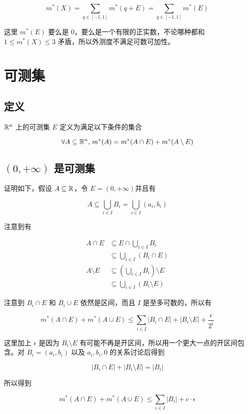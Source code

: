 \[
m^*(X) = \sum_{q \in [-1,1]}m^*(q+E) =  \sum_{q \in [-1,1]}m^*(E)
\]

这里 $m^*(E)$ 要么是 $0$，要么是一个有限的正实数，不论哪种都和 $1 \le m^*(X) \le 3$ 矛盾，所以外测度不满足可数可加性。


\section{可测集}

\subsection{定义}

$\mathbb{R}^n $ 上的可测集 $E$ 定义为满足以下条件的集合

\[
\forall A \subseteq \mathbb{R}^n,\, m^*(A) = m^*(A \cap E) + m^*(A \setminus E)
\]

\subsection{$(0, +\infty)$ 是可测集} 

证明如下，假设 $A \subseteq \mathbb{R}$，令 $ E = (0, +\infty)$并且有

\[
A \subseteq \bigcup_{i \in I} B_i = \bigcup_{i \in I} (a_i, b_i)
\]

注意到有

\begin{align*}
A \cap E &\subseteq E \cap \bigcup_{i \in I} B_i \\
 & \subseteq \bigcup_{i \in I} (B_i \cap E) \\
A \setminus E &\subseteq  (\bigcup_{i \in I} B_i) \setminus E \\
 & \subseteq \bigcup_{i \in I} (B_i \setminus E)
\end{align*}

注意到 $B_i \cap E$ 和 $B_i \cup E$ 依然是区间，而且 $I$ 是至多可数的，所以有

\[
m^*(A\cap E) + m^*(A \cup E) \le \sum_{i \in I} \lvert B_i \cap E\rvert + \lvert B_i \setminus E \rvert + \frac{\epsilon}{2^i}
\]

这里加上 $\epsilon$ 是因为 $B_i \setminus E$ 有可能不再是开区间，所以用一个更大一点的开区间包含。对 $B_i = (a_i, b_i)$ 以及 $a_i, b_i, 0$ 的关系讨论后得到

\[
\lvert B_i \cap E\rvert + \lvert B_i \setminus E \rvert = \lvert B_i \rvert
\]

所以得到

\[
m^*(A\cap E) + m^*(A \cup E) \le \sum_{i \in I} \lvert B_i \rvert + c \cdot \epsilon
\]

